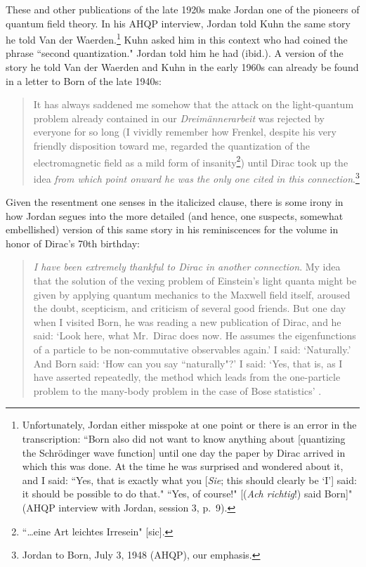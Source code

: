 \documentclass{elsart}
\begin{document}
These and other publications of the late 1920s make Jordan one of the pioneers of quantum field theory. In his AHQP interview, Jordan told Kuhn the same story he told Van der Waerden.\footnote{Unfortunately, Jordan either misspoke at one point or there is an error in the transcription: ``Born also did not want to know anything about [quantizing the Schr\"odinger wave function] until one day the paper by Dirac arrived in which this was done. At the time he was surprised and wondered about it, and I said: ``Yes, that is exactly what you [{\it Sie}; this should clearly be `I'] said: it should be possible to do that." ``Yes, of course!" [({\it Ach richtig}!) said Born]" (AHQP interview with Jordan, session 3, p.\ 9).} Kuhn asked him in this context who had coined the phrase ``second quantization." Jordan told him he had (ibid.).  A version of the story he told Van der Waerden and Kuhn in the early 1960s can already be found in a letter to Born of the late 1940s:
\begin{quotation}
It has always saddened me somehow that the attack on the light-quantum problem already contained in our {\it Dreim\"annerarbeit} was rejected by everyone for so long (I vividly remember how Frenkel, despite his very friendly disposition toward me, regarded the quantization of the electromagnetic field as a mild form of insanity\footnote{``\ldots eine Art leichtes Irresein" [sic].}) until Dirac took up the idea {\it from which point onward he was the only one cited in this connection}.\footnote{Jordan to Born, July 3, 1948 (AHQP), our emphasis.}
\end{quotation}
Given the resentment one senses in the italicized clause, there is some irony in how Jordan segues into the more detailed (and hence, one suspects, somewhat embellished) version of this same story in his reminiscences for the volume in honor of Dirac's 70th birthday:
\begin{quotation}
{\it I have been extremely thankful to Dirac in another connection}. My idea that the solution of the vexing problem of Einstein's light quanta might be given by applying quantum mechanics to the Maxwell field itself, aroused the doubt, scepticism, and criticism of several good friends. But one day when I visited Born, he was reading a new publication of Dirac, and he said: `Look here, what Mr.\ Dirac does now. He assumes the eigenfunctions of a particle to be non-commutative observables again.' I said: `Naturally.' And Born said: `How can you say ``naturally"?' I said: `Yes, that is, as I have asserted repeatedly, the method which leads from the one-particle problem to the many-body problem in the case of Bose statistics' \citep[p.\ 297; our emphasis]{Jordan 1973}.
\end{quotation}
\end{document}
